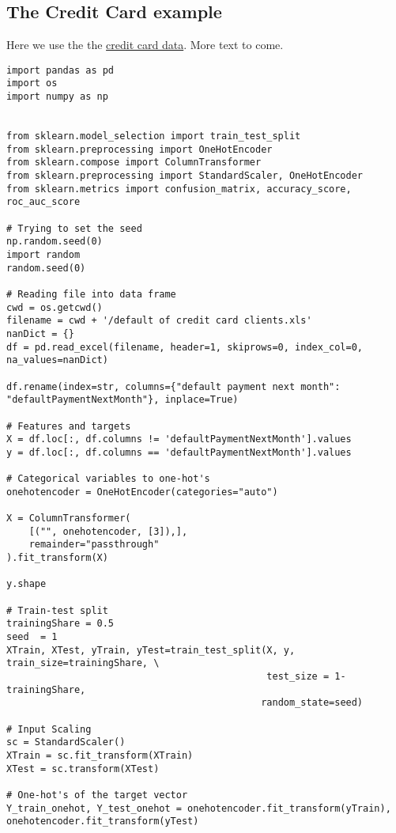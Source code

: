 \documentclass[%
oneside,                 %
final,                   %
10pt]{article}
\begin{document}
\subsection*{The Credit Card example}
Here we use the the \href{{https://archive.ics.uci.edu/ml/datasets/default+of+credit+card+clients}}{credit card data}. More text to come.

\begin{verbatim}
import pandas as pd
import os
import numpy as np


from sklearn.model_selection import train_test_split
from sklearn.preprocessing import OneHotEncoder
from sklearn.compose import ColumnTransformer
from sklearn.preprocessing import StandardScaler, OneHotEncoder
from sklearn.metrics import confusion_matrix, accuracy_score, roc_auc_score

# Trying to set the seed
np.random.seed(0)
import random
random.seed(0)

# Reading file into data frame
cwd = os.getcwd()
filename = cwd + '/default of credit card clients.xls'
nanDict = {}
df = pd.read_excel(filename, header=1, skiprows=0, index_col=0, na_values=nanDict)

df.rename(index=str, columns={"default payment next month": "defaultPaymentNextMonth"}, inplace=True)

# Features and targets 
X = df.loc[:, df.columns != 'defaultPaymentNextMonth'].values
y = df.loc[:, df.columns == 'defaultPaymentNextMonth'].values

# Categorical variables to one-hot's
onehotencoder = OneHotEncoder(categories="auto")

X = ColumnTransformer(
    [("", onehotencoder, [3]),],
    remainder="passthrough"
).fit_transform(X)

y.shape

# Train-test split
trainingShare = 0.5 
seed  = 1
XTrain, XTest, yTrain, yTest=train_test_split(X, y, train_size=trainingShare, \
                                              test_size = 1-trainingShare,
                                             random_state=seed)

# Input Scaling
sc = StandardScaler()
XTrain = sc.fit_transform(XTrain)
XTest = sc.transform(XTest)

# One-hot's of the target vector
Y_train_onehot, Y_test_onehot = onehotencoder.fit_transform(yTrain), onehotencoder.fit_transform(yTest)


\end{verbatim}
\end{document}

